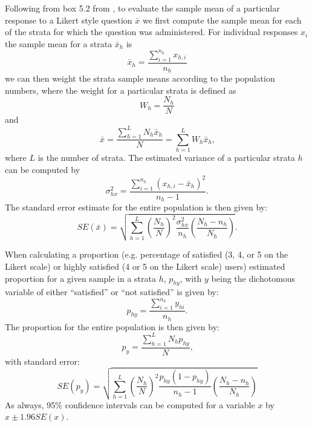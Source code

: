 \documentclass[12pt]{article} %
\begin{document}
Following from box 5.2 from \cite{Levy}, to evaluate the sample mean of a particular response to a Likert style
question $\bar{x}$ we first compute the sample mean for each of the strata for which the question was
administered. For individual responses $x_i$ the sample mean for a strata $\bar{x}_h$ is
\begin{equation}
\bar{x}_h=\frac{\sum\limits_{i=1}^{n_h}x_{h,i}}{n_h}
\end{equation} 
we can then weight the strata sample means according to the population numbers, where the weight for a
particular strata is defined as
\begin{equation}
W_h =\frac{N_h}{N}
\end{equation}
and
\begin{equation}
\bar{x}=\frac{\sum\limits_{h=1}^L N_h \bar{x}_h}{N}=\sum\limits_{h=1}^L W_h \bar{x}_h\mbox{,}
\end{equation}
where $L$ is the number of strata. The estimated variance of a particular strata $h$ can be computed by
\begin{equation}
\sigma^2_{hx}=\frac{\sum\limits_{i=1}^{n_h}(x_{h,i}-\bar{x}_h)^2}{n_h-1}\mbox{.}
\end{equation}
The standard error estimate for the entire population is then given by:
\begin{equation}
SE(\bar{x})=\sqrt{\sum\limits_{h=1}^L \left( \frac{N_h}{N} \right)^2\frac{\sigma^2_{hx}}{n_h} \left( \frac{N_h-n_h}{N_h} \right) }\mbox{.}
\end{equation}

When calculating a proportion (e.g. percentage of satisfied (3, 4, or 5 on the Likert scale) or highly
satisfied (4 or 5 on the Likert scale) users) estimated proportion for a given sample in a strata $h$, $p_{hy}$, with $y$ being the
dichotomous variable of either ``satisfied'' or ``not satisfied'' is given by:
\begin{equation}
p_{hy}=\frac{\sum\limits_{i=1}^{n_h} y_{hi}}{n_h}\mbox{.}
\end{equation}
The proportion for the entire population is then given by:
\begin{equation}
p_y=\frac{\sum\limits_{h=1}^L N_h p_{hy}}{N}\mbox{,}
\end{equation}
with standard error:
\begin{equation}
SE(p_y)=\sqrt{\sum\limits_{h=1}^L\left(\frac{N_h}{N}\right)^2\frac{p_{hy}\left(1-p_{hy}\right)}{n_h-1}\left(\frac{N_h-n_h}{N_h}\right)}
\end{equation}
As always, 95\% confidence intervals can be computed for a variable $x$ by $x \pm 1.96 SE(x)$.






\end{document}
